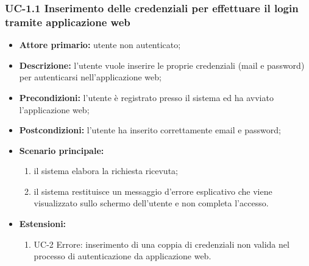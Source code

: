 \subsubsection{UC-1.1 Inserimento delle credenziali per effettuare il login tramite applicazione web}
\begin{itemize}
	\item \textbf{Attore primario:} utente non autenticato;

	\item \textbf{Descrizione:} l'utente vuole inserire le proprie credenziali (mail e password) per autenticarsi nell'applicazione web;

	\item \textbf{Precondizioni:} l'utente è registrato presso il sistema ed ha avviato l'applicazione web;

	\item \textbf{Postcondizioni:} l'utente ha inserito correttamente email e password;

	\item \textbf{Scenario principale:}
	      \begin{enumerate}
		      \item il sistema elabora la richiesta ricevuta;
		      \item il sistema restituisce un messaggio d'errore esplicativo che viene visualizzato sullo schermo dell'utente e non completa l'accesso.
	      \end{enumerate}
	\item \textbf{Estensioni:}
		\begin{enumerate}
		      \item UC-2 Errore: inserimento di una coppia di credenziali non valida nel processo di autenticazione da applicazione web.
	      \end{enumerate}
\end{itemize}

